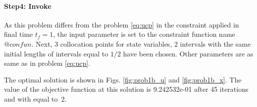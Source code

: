 \paragraph{Step4: Invoke~}

{\small }

As this problem differs from the problem \eqref{eq:ucp} in the
constraint applied in final time $t_{f} = 1$, the input parameter
 is set to the constraint function name
$@confun$. Next, 3 collocation points for state variables, 2 intervals
with the same initial lengths of intervals equal to $1/2$ have been
chosen. Other parameters are as same as in problem \eqref{eq:ucp}.

The optimal solution is shown in Figs. \ref{fig:prob1b_u} and
\ref{fig:prob1b_x}. The value of the objective function at this
solution is 9.242532e-01 after 45 iterations and with 
equal to~2.

